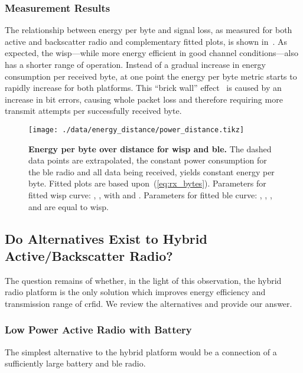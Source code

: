\documentclass[conference,letterpaper,twoside,final,10pt]{IEEEtran}
\begin{document}
\subsubsection{Measurement Results}
\label{sec:motivation/results}

The relationship between energy per byte and signal loss, as measured for both active and backscatter radio and complementary fitted plots, is shown in~.
As expected, the \ac{wisp}---while more energy efficient in good channel conditions---also has a shorter range of operation.
Instead of a gradual increase in energy consumption per received byte, at one point the energy per byte metric starts to rapidly increase for both platforms.
This ``brick wall'' effect~\cite[Sec. V]{lettieri1998info} is caused by an increase in bit errors, causing whole packet loss and therefore requiring more transmit attempts per successfully received byte.

\begin{figure}
	\centering
	\texttt{[image: ./data/energy\_distance/power\_distance.tikz]}
	\vspace{-25pt}
	\caption{\textbf{Energy per byte over distance for \acs{wisp} and \acs{ble}.}
	The dashed data points are extrapolated, the constant power consumption for the \acs{ble} radio and all data being received, yields constant energy per byte.
	Fitted plots are based upon~(\ref{eq:rx_bytes}).
	Parameters for fitted \acs{wisp} curve: , ,  with  and .
	Parameters for fitted \acs{ble} curve: , , ,  and  are equal to \acs{wisp}.
	}
	\label{fig:power_distance}
\end{figure}

\subsection{Do Alternatives Exist to Hybrid Active/Backscatter Radio?}
\label{sec:motivation/alternatives}

The question remains of whether, in the light of this observation, the hybrid radio platform is the only solution which improves energy efficiency and transmission range of \ac{crfid}. We review the alternatives and provide our answer.

\subsubsection{Low Power Active Radio with Battery}
\label{sec:alternatives/blebatt}

The simplest alternative to the hybrid platform would be a connection of a sufficiently large battery and \ac{ble} radio.
\end{document}
